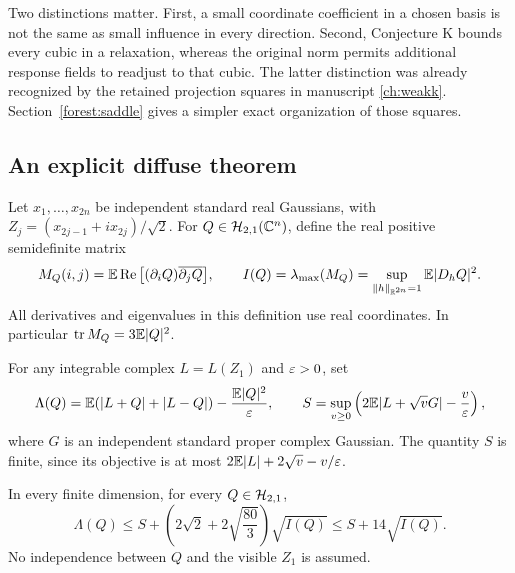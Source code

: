 Two distinctions matter. First, a small coordinate coefficient in a
chosen basis is not the same as small influence in every direction.
Second, Conjecture K bounds every cubic in a relaxation, whereas the
original norm permits additional response fields to readjust to that
cubic. The latter distinction was already recognized by the retained
projection squares in manuscript \autoref{ch:weakk}. Section~\ref{forest:saddle}
gives a simpler exact organization of those squares.

\subsection{An explicit diffuse theorem}
\label{forest:diffuse}

Let \(x_1,\ldots,x_{2n}\) be independent standard real Gaussians, with
\(Z_j=(x_{2j-1}+ix_{2j})/\sqrt2\). For
\(Q\in\mathcal H_{2,1}(\mathbb C^n)\), define the real positive semidefinite matrix
\[
M_Q(i,j)=\mathbb E\operatorname{Re}\big[(\partial_iQ)\overline{\partial_jQ}\big],
\qquad
I(Q)=\lambda_{\max}(M_Q)
 =\sup_{\|h\|_{\mathbb R^{2n}}=1}\mathbb E|D_hQ|^2.
\]
All derivatives and eigenvalues in this definition use real coordinates.
In particular \(\operatorname{tr} M_Q=3\mathbb E|Q|^2\).

For any integrable complex \(L=L(Z_1)\) and \(\varepsilon>0\), set
\[
\Lambda(Q)=\mathbb E(|L+Q|+|L-Q|)-\frac{\mathbb E|Q|^2}{\varepsilon},
\qquad
S=\sup_{v\ge0}\left(2\mathbb E|L+\sqrt vG|-\frac v{\varepsilon}\right),
\]
where \(G\) is an independent standard proper complex Gaussian.
The quantity \(S\) is finite, since its objective is at most
\(2\mathbb E|L|+2\sqrt v-v/\varepsilon\).

\begin{theorem}
\label{forest:thm-diffuse}
In every finite dimension, for every \(Q\in\mathcal H_{2,1}\),
\[
\Lambda(Q)\le S+
\left(2\sqrt2+2\sqrt{\frac{80}{3}}\right)\sqrt{I(Q)}
\le S+14\sqrt{I(Q)}.
\]
No independence between \(Q\) and the visible \(Z_1\) is assumed.
\end{theorem}


